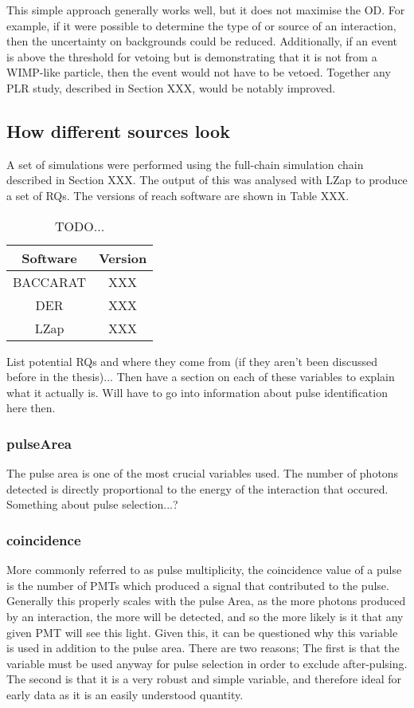 \par
This simple approach generally works well, but it does not maximise the OD.
For example, if it were possible to determine the type of or source of an interaction, then the uncertainty on backgrounds could be reduced.
Additionally, if an event is above the threshold for vetoing but is demonstrating that it is not from a WIMP-like particle, then the event would not have to be vetoed.
Together any PLR study, described in Section XXX, would be notably improved.

\subsection{How different sources look}
\par
A set of simulations were performed using the full-chain simulation chain described in Section XXX.
The output of this was analysed with LZap to produce a set of RQs.
The versions of reach software are shown in Table XXX.

\begin{table}[!htbp]
    \centering
    \begin{tabular}{c|c}
        Software & Version \\ \hline
        BACCARAT & XXX\\
        DER & XXX\\
        LZap & XXX
    \end{tabular}
    \caption{TODO...}
    \label{tab:od_simulation_versions}
\end{table}


\par
List potential RQs and where they come from (if they aren't been discussed before in the thesis)...
Then have a section on each of these variables to explain what it actually is.
Will have to go into information about pulse identification here then.
\subsubsection{pulseArea}
The pulse area is one of the most crucial variables used.
The number of photons detected is directly proportional to the energy of the interaction that occured.
Something about pulse selection...?

\subsubsection{coincidence}
More commonly referred to as pulse multiplicity, the coincidence value of a pulse is the number of PMTs which produced a signal that contributed to the pulse.
Generally this properly scales with the pulse Area, as the more photons produced by an interaction, the more will be detected, and so the more likely is it that any given PMT will see this light.
Given this, it can be questioned why this variable is used in addition to the pulse area. 
There are two reasons;
The first is that the variable must be used anyway for pulse selection in order to exclude after-pulsing.
The second is that it is a very robust and simple variable, and therefore ideal for early data as it is an easily understood quantity.

